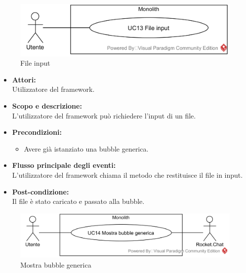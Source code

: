 
\begin{figure}[H]
	\centering
	\includegraphics[width=15cm]{../../documenti/AnalisiDeiRequisiti/Diagrammi_img/usecase/uc1_34.png}
	\caption{\UCCaption{} File input}
\end{figure}

\begin{itemize}
	\item \textbf{Attori:}
	\\Utilizzatore del framework.
	\item \textbf{Scopo e descrizione:} 
	\\L'utilizzatore del framework può richiedere l'input di un file.
	\item \textbf{Precondizioni:}
	\begin{itemize}
		\item Avere già istanziato una bubble generica.
	\end{itemize}
	\item \textbf{Flusso principale degli eventi:}
	\\L'utilizzatore del framework chiama il metodo che restituisce il file in input.
	\item \textbf{Post-condizione:}
	\\Il file è stato caricato e passato alla bubble.
\end{itemize}


\begin{figure}[H]
	\centering
	\includegraphics[width=15cm]{../../documenti/AnalisiDeiRequisiti/Diagrammi_img/usecase/uc1_36.png}
	\caption{\UCCaption{} Mostra bubble generica}
\end{figure}

